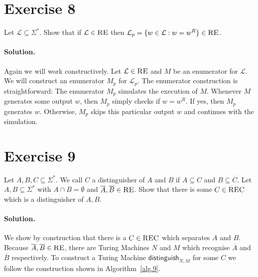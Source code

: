 \documentclass[11pt]{llncs}
\begin{document}
\section*{Exercise 8}
Let $\mathcal{L} \subseteq \Sigma^*$. Show that if $\mathcal{L} \in \textsc{RE}$
then $\mathcal{L}_p = \{w \in \mathcal{L}: w = w^R\} \in \textsc{RE}$.

\paragraph{Solution.}

Again we will work constructively. Let $\mathcal{L} \in \textsc{RE}$ and $M$ be
an enumerator for $\mathcal{L}$. We will construct an enumerator $M_p$ for
$\mathcal{L}_p$. The enumerator construction is straightforward: The enumerator
$M_p$ simulates the execution of $M$. Whenever $M$ generates some output $w$,
then $M_p$ simply checks if $w = w^R$. If yes, then $M_p$ generates $w$.
Otherwise, $M_p$ skips this particular output $w$ and continues with the
simulation.

\section*{Exercise 9}

Let $A, B, C \subseteq \Sigma^*$. We call $C$ a distinguisher of $A$ and $B$ if
$A \subseteq C$ and $B \subseteq \overline C$. Let $A, B \subseteq \Sigma^*$
with $A \cap B = \emptyset$ and $\overline A, \overline B \in \textsc{RE}$.
Show that there is some $C \in \textsc{REC}$ which is a distinguisher of $A, B$.

\paragraph{Solution.}

We show by construction that there is a $C \in \textsc{REC}$ which separates $A$
and $B$. Because $\overline A, \overline B \in \textsc{RE}$, there are Turing
Machines $N$ and $M$ which recognise $\overline A$ and $\overline B$
respectively. To construct a Turing Machine $\textsf{distinguish}_{N,M}$ for
some $C$ we follow the construction shown in Algorithm~\ref{alg.9}.
\end{document}
